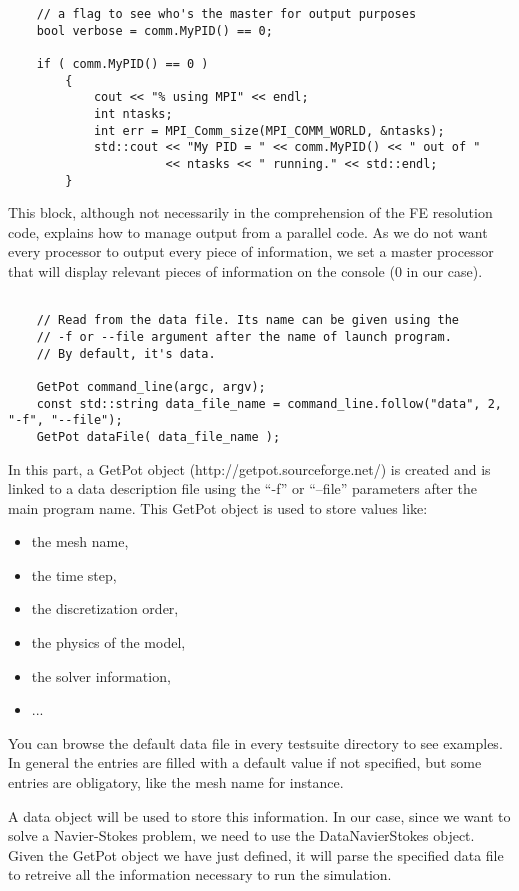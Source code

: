 \begin{verbatim}
    // a flag to see who's the master for output purposes
    bool verbose = comm.MyPID() == 0;

    if ( comm.MyPID() == 0 )
        {
            cout << "% using MPI" << endl;
            int ntasks;
            int err = MPI_Comm_size(MPI_COMM_WORLD, &ntasks);
            std::cout << "My PID = " << comm.MyPID() << " out of "
                      << ntasks << " running." << std::endl;
        }
\end{verbatim}
This block, although not necessarily in the comprehension of the FE resolution code, explains
how to manage output from a parallel code. As we do not want every processor to output
every piece of information, we set a master processor that will display relevant
pieces of information on the console ($0$ in our case).
\begin{verbatim}

    // Read from the data file. Its name can be given using the
    // -f or --file argument after the name of launch program.
    // By default, it's data.

    GetPot command_line(argc, argv);
    const std::string data_file_name = command_line.follow("data", 2, "-f", "--file");
    GetPot dataFile( data_file_name );

\end{verbatim}

\noindent In this part, a GetPot object (http://getpot.sourceforge.net/) is created
and is linked to a data description file using  the ``-f'' or ``--file'' parameters after
the main program name. This GetPot object is used to store values like:
\begin{itemize}
\item the mesh name,
\item the time step,
\item the discretization order,
\item the physics of the model,
\item the solver information,
\item ...
\end{itemize}
You can browse the default data file in every testsuite directory to see examples.
In general the entries
are filled with a default value if not specified,
but some entries are obligatory, like the mesh name for instance. 

A data object will be used to store this information. In our case, since we want to
solve a Navier-Stokes problem, we need to use the DataNavierStokes object.
Given the GetPot object we have just defined, it will parse the specified data file
to retreive all the information necessary to run the simulation.

